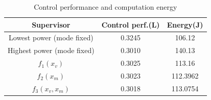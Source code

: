\begin{table}[htb]
\begin{center}
\caption{Control performance and computation energy}
\label{tbl:performance}
\begin{tabular} {|c|c|c|}
	\hline
	\textbf{Supervisor} & \textbf{Control perf.}(L) & \textbf{Energy}(J) \\ \hline
	Lowest power (mode fixed) & 0.3245 & 106.12  \\ \hline
	Highest power (mode fixed) & 0.3010 & 140.13  \\ \hline
	 $f_1(x_v)$ & 0.3025 & 113.16  \\ \hline
	 $f_2(x_m)$ & 0.3023 & 112.3962 \\ \hline
	 $f_3(x_v,x_m)$ & 0.3018 & 113.0754 \\ \hline
	 
\end{tabular}
	\vspace{-10pt}	
	\end{center}
\end{table}


